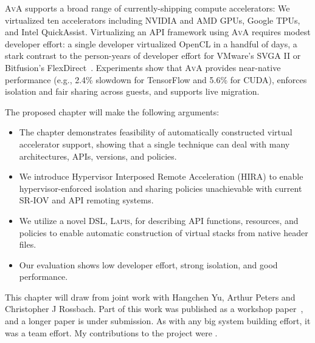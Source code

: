 \textsc{AvA} supports a broad range of currently-shipping compute accelerators:
We virtualized ten accelerators including NVIDIA and AMD GPUs, Google TPUs,
and Intel QuickAssist.
Virtualizing an API framework using \textsc{AvA} requires modest developer
effort:
a single developer virtualized OpenCL in a handful of days,
a stark contrast to the person-years of developer effort for VMware's SVGA II
or Bitfusion's FlexDirect~\cite{bitfusion}.
Experiments show that \textsc{AvA} provides near-native performance (e.g., 2.4\% slowdown for TensorFlow and 5.6\% for CUDA), enforces isolation and fair sharing across guests, and supports live migration.

The proposed chapter will make the following arguments:

\begin{itemize}[nosep,leftmargin=1em,labelwidth=*,align=left]
\item The chapter demonstrates feasibility of automatically constructed virtual accelerator support, showing that a single technique can deal with many architectures, APIs, versions, and policies.
\item We introduce {{H}ypervisor {I}nterposed {R}emote {A}cceleration} (HIRA) to enable hypervisor-enforced isolation and sharing policies unachievable with current SR-IOV and API remoting systems.
\item We utilize a novel DSL, \textsc{Lapis}, for describing API functions, resources, and policies to enable automatic construction of virtual stacks from native header files.
\item Our evaluation shows low developer effort, strong isolation, and good performance.
\end{itemize}

This chapter will draw from joint work with Hangchen Yu, Arthur Peters and Christopher J Rossbach. Part of this work was published as a workshop paper~\cite{ava-hotos}, and a longer paper is under submission. As with any big system building effort, it was a team effort. My contributions to the project were .
